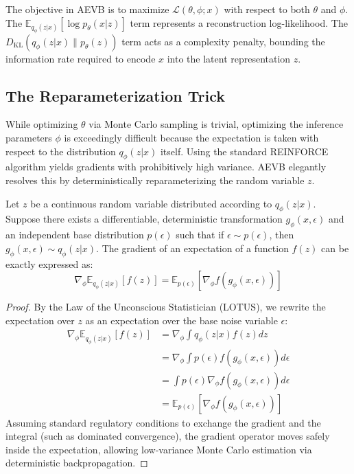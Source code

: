 The objective in AEVB is to maximize $\mathcal{L}(\theta, \phi; x)$ with respect to both $\theta$ and $\phi$. The $\mathbb{E}_{q_\phi(z|x)}[\log p_\theta(x|z)]$ term represents a reconstruction log-likelihood. The $D_{\text{KL}}(q_\phi(z|x) \parallel p_\theta(z))$ term acts as a complexity penalty, bounding the information rate required to encode $x$ into the latent representation $z$. 

\subsection{The Reparameterization Trick}
While optimizing $\theta$ via Monte Carlo sampling is trivial, optimizing the inference parameters $\phi$ is exceedingly difficult because the expectation is taken with respect to the distribution $q_\phi(z|x)$ itself. Using the standard REINFORCE algorithm yields gradients with prohibitively high variance. AEVB elegantly resolves this by deterministically reparameterizing the random variable $z$.

\begin{theorem}
\label{thm:reparam}
Let $z$ be a continuous random variable distributed according to $q_\phi(z|x)$. Suppose there exists a differentiable, deterministic transformation $g_\phi(x, \epsilon)$ and an independent base distribution $p(\epsilon)$ such that if $\epsilon \sim p(\epsilon)$, then $g_\phi(x, \epsilon) \sim q_\phi(z|x)$. The gradient of an expectation of a function $f(z)$ can be exactly expressed as:
\begin{equation}
    \nabla_\phi \mathbb{E}_{q_\phi(z|x)}[f(z)] = \mathbb{E}_{p(\epsilon)}[\nabla_\phi f(g_\phi(x, \epsilon))]
\end{equation}
\end{theorem}
\begin{proof}
By the Law of the Unconscious Statistician (LOTUS), we rewrite the expectation over $z$ as an expectation over the base noise variable $\epsilon$:
\begin{align}
    \nabla_\phi \mathbb{E}_{q_\phi(z|x)}[f(z)] &= \nabla_\phi \int q_\phi(z|x) f(z) dz \\
    &= \nabla_\phi \int p(\epsilon) f(g_\phi(x, \epsilon)) d\epsilon \\
    &= \int p(\epsilon) \nabla_\phi f(g_\phi(x, \epsilon)) d\epsilon \\
    &= \mathbb{E}_{p(\epsilon)}[\nabla_\phi f(g_\phi(x, \epsilon))]
\end{align}
Assuming standard regulatory conditions to exchange the gradient and the integral (such as dominated convergence), the gradient operator moves safely inside the expectation, allowing low-variance Monte Carlo estimation via deterministic backpropagation.
\end{proof}


